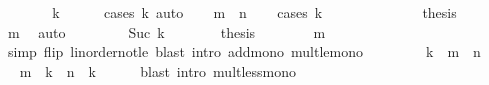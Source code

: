 \begin{isabellebody}
\ \ \isamarkupfalse%
\ \isamarkupfalse%
\ {\isachardoublequoteopen}{}\ {\isacharless}{\kern0pt}\ k{\isachardoublequoteclose}\isanewline
\ \ \ \ \isamarkupfalse%
\ {\isacharparenleft}{\kern0pt}cases\ k{\isacharparenright}{\kern0pt}\ auto\isanewline
\ \ \isamarkupfalse%
\ {\isachardoublequoteopen}m\ {\isacharless}{\kern0pt}\ n{\isachardoublequoteclose}\isanewline
\ \ \isamarkupfalse%
\ {\isacharparenleft}{\kern0pt}cases\ k{\isacharparenright}{\kern0pt}\isanewline
\ \ \ \ \isamarkupfalse%
\ {}\isanewline
\ \ \ \ \isamarkupfalse%
\ \isamarkupfalse%
\ {\isacharquery}{\kern0pt}thesis\isanewline
\ \ \ \ \ \ \isamarkupfalse%
\ m\ \isamarkupfalse%
\ auto\isanewline
\ \ \isamarkupfalse%
\isanewline
\ \ \ \ \isamarkupfalse%
\ {\isacharparenleft}{\kern0pt}Suc\ k{\isacharprime}{\kern0pt}{\isacharparenright}{\kern0pt}\isanewline
\ \ \ \ \isamarkupfalse%
\ \isamarkupfalse%
\ {\isacharquery}{\kern0pt}thesis\isanewline
\ \ \ \ \ \ \isamarkupfalse%
\ m\isanewline
\ \ \ \ \ \ \isamarkupfalse%
\ {\isacharparenleft}{\kern0pt}simp\ flip{\isacharcolon}{\kern0pt}\ linorder{\isacharunderscore}{\kern0pt}not{\isacharunderscore}{\kern0pt}le{\isacharparenright}{\kern0pt}\ {\isacharparenleft}{\kern0pt}blast\ intro{\isacharcolon}{\kern0pt}\ add{\isacharunderscore}{\kern0pt}mono\ mult{\isacharunderscore}{\kern0pt}le{\isacharunderscore}{\kern0pt}mono{}{\isacharparenright}{\kern0pt}\isanewline
\ \ \isamarkupfalse%
\isanewline
{}\isamarkupfalse%
\isanewline
\ \ \isamarkupfalse%
\ {\isachardoublequoteopen}{}\ {\isacharless}{\kern0pt}\ k\ {\isasymand}\ m\ {\isacharless}{\kern0pt}\ n{\isachardoublequoteclose}\isanewline
\ \ \isamarkupfalse%
\ \isamarkupfalse%
\ {\isachardoublequoteopen}m\ {\isacharasterisk}{\kern0pt}\ k\ {\isacharless}{\kern0pt}\ n\ {\isacharasterisk}{\kern0pt}\ k{\isachardoublequoteclose}\isanewline
\ \ \ \ \isamarkupfalse%
\ {\isacharparenleft}{\kern0pt}blast\ intro{\isacharcolon}{\kern0pt}\ mult{\isacharunderscore}{\kern0pt}less{\isacharunderscore}{\kern0pt}mono{}{\isacharparenright}{\kern0pt}\isanewline
{}\isamarkupfalse%
%
\endisatagproof
{\isafoldproof}%
%
\isadelimproof
\isanewline
%
\endisadelimproof
\isanewline
{}\isamarkupfalse%

\end{isabellebody}
